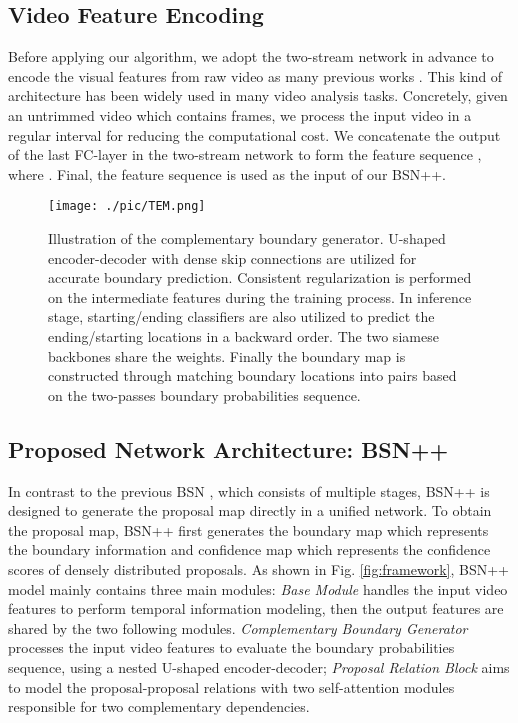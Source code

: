 \documentclass[letterpaper]{article} \usepackage{aaai21}  \usepackage{times}  \usepackage{helvet} \usepackage{courier}  \usepackage[hyphens]{url}  \usepackage{graphicx} \urlstyle{rm} \def\UrlFont{\rm}  \usepackage{natbib}  \usepackage{amsmath,amssymb} \usepackage{caption} \frenchspacing  \usepackage{color}
\begin{document}
\subsection{Video Feature Encoding}

Before applying our algorithm, we adopt the two-stream network \cite{K.Simonyan} in advance to encode the visual features from raw video as many previous works \cite{BSN,Gao2018CTAP,Su2018Cascaded,Su2020MGFN}. This kind of architecture has been widely used in many video analysis tasks\cite{SSAD,SSN,CBR}. Concretely, given an untrimmed video  which contains  frames, we process the input video in a regular interval  for reducing the computational cost. We concatenate the output of the last FC-layer in the two-stream network to form the feature sequence , where . Final, the feature sequence  is used as the input of our BSN++.


\begin{figure}[t]
	\centering
\texttt{[image: ./pic/TEM.png]} \caption{Illustration of the complementary boundary generator. U-shaped encoder-decoder with dense skip connections are utilized for accurate boundary prediction. Consistent regularization is performed on the intermediate features during the training process. In inference stage, starting/ending classifiers are also utilized to predict the ending/starting locations in a backward order. The two siamese backbones share the weights. Finally the boundary map is constructed through matching boundary locations into pairs based on the two-passes boundary probabilities sequence.}
	\label{fig:TEM}
\end{figure}


\subsection{Proposed Network Architecture: BSN++}


In contrast to the previous BSN \cite{BSN}, which consists of multiple stages, BSN++ is designed to generate the proposal map directly in a unified network. To obtain the proposal map, BSN++ first generates the boundary map which represents the boundary information and confidence map which represents the confidence scores of densely distributed proposals. As shown in Fig. \ref{fig:framework}, BSN++ model mainly contains three main modules:  \textit{Base Module} handles the input video features to perform temporal information modeling, then the output features are shared by the two following modules. \textit{Complementary Boundary Generator} processes the input video features to evaluate the boundary probabilities sequence, using a nested U-shaped encoder-decoder; \textit{Proposal Relation Block} aims to model the proposal-proposal relations with two self-attention modules responsible for two complementary dependencies.
\end{document}
